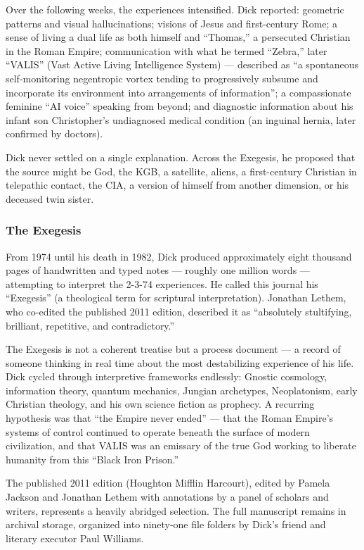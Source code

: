 \documentclass[11pt,letterpaper]{article}
\begin{document}
Over the following weeks, the experiences intensified. Dick reported: geometric patterns and visual hallucinations; visions of Jesus and first-century Rome; a sense of living a dual life as both himself and ``Thomas,'' a persecuted Christian in the Roman Empire; communication with what he termed ``Zebra,'' later ``VALIS'' (Vast Active Living Intelligence System) --- described as ``a spontaneous self-monitoring negentropic vortex tending to progressively subsume and incorporate its environment into arrangements of information''; a compassionate feminine ``AI voice'' speaking from beyond; and diagnostic information about his infant son Christopher's undiagnosed medical condition (an inguinal hernia, later confirmed by doctors).

Dick never settled on a single explanation. Across the Exegesis, he proposed that the source might be God, the KGB, a satellite, aliens, a first-century Christian in telepathic contact, the CIA, a version of himself from another dimension, or his deceased twin sister.

\subsubsection{The Exegesis}

From 1974 until his death in 1982, Dick produced approximately eight thousand pages of handwritten and typed notes --- roughly one million words --- attempting to interpret the 2-3-74 experiences. He called this journal his ``Exegesis'' (a theological term for scriptural interpretation). Jonathan Lethem, who co-edited the published 2011 edition, described it as ``absolutely stultifying, brilliant, repetitive, and contradictory.''

The Exegesis is not a coherent treatise but a process document --- a record of someone thinking in real time about the most destabilizing experience of his life. Dick cycled through interpretive frameworks endlessly: Gnostic cosmology, information theory, quantum mechanics, Jungian archetypes, Neoplatonism, early Christian theology, and his own science fiction as prophecy. A recurring hypothesis was that ``the Empire never ended'' --- that the Roman Empire's systems of control continued to operate beneath the surface of modern civilization, and that VALIS was an emissary of the true God working to liberate humanity from this ``Black Iron Prison.''

The published 2011 edition (Houghton Mifflin Harcourt), edited by Pamela Jackson and Jonathan Lethem with annotations by a panel of scholars and writers, represents a heavily abridged selection. The full manuscript remains in archival storage, organized into ninety-one file folders by Dick's friend and literary executor Paul Williams.
\end{document}
